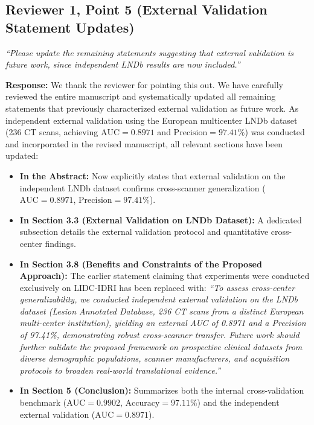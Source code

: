 \documentclass[11pt,a4paper]{article}
\newcommand{\reviewer}[1]{{\color{reviewgray}\textit{#1}}}
\newenvironment{authorresponse}{\par\begingroup\color{authorblue}}{\endgroup\par}
\newcommand{\manuscript}[1]{\textit{``#1''}}
\begin{document}
\vspace{1.5em}

\subsection*{Reviewer 1, Point 5 (External Validation Statement Updates)}

\reviewer{“Please update the remaining statements suggesting that external validation is future work, since independent LNDb results are now included.”}

\begin{authorresponse}
\textbf{Response:}
We thank the reviewer for pointing this out. We have carefully reviewed the entire manuscript and systematically updated all remaining statements that previously characterized external validation as future work. As independent external validation using the European multicenter LNDb dataset (236 CT scans, achieving $\mathrm{AUC} = 0.8971$ and $\mathrm{Precision} = 97.41\%$) was conducted and incorporated in the revised manuscript, all relevant sections have been updated:
\begin{itemize}[leftmargin=2em]
  \item \textbf{In the Abstract:} Now explicitly states that external validation on the independent LNDb dataset confirms cross-scanner generalization ($\mathrm{AUC} = 0.8971$, $\mathrm{Precision} = 97.41\%$).
  \item \textbf{In Section 3.3 (External Validation on LNDb Dataset):} A dedicated subsection details the external validation protocol and quantitative cross-center findings.
  \item \textbf{In Section 3.8 (Benefits and Constraints of the Proposed Approach):} The earlier statement claiming that experiments were conducted exclusively on LIDC-IDRI has been replaced with: \manuscript{To assess cross-center generalizability, we conducted independent external validation on the LNDb dataset (Lesion Annotated Database, 236 CT scans from a distinct European multi-center institution), yielding an external AUC of 0.8971 and a Precision of 97.41\%, demonstrating robust cross-scanner transfer. Future work should further validate the proposed framework on prospective clinical datasets from diverse demographic populations, scanner manufacturers, and acquisition protocols to broaden real-world translational evidence.}
  \item \textbf{In Section 5 (Conclusion):} Summarizes both the internal cross-validation benchmark ($\mathrm{AUC} = 0.9902$, $\mathrm{Accuracy} = 97.11\%$) and the independent external validation ($\mathrm{AUC} = 0.8971$).
\end{itemize}
\end{authorresponse}
\end{document}
